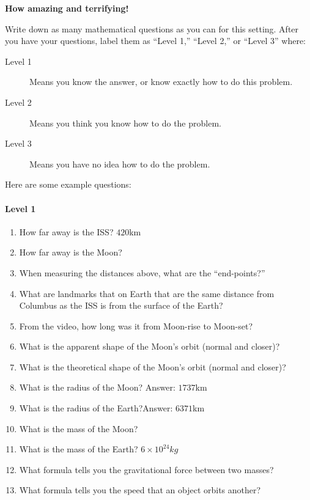 \documentclass{ximera}
\begin{document}
\begin{center}
\textbf{How amazing and terrifying!}
\end{center}
\begin{problem}
     Write down as many mathematical questions as you can for this
     setting. After you have your questions, label them as ``Level
     1,'' ``Level 2,'' or ``Level 3'' where:
\begin{description}
\item[Level 1] Means you know the answer, or know exactly how to do
  this problem.
\item[Level 2] Means you think you know how to do the problem.
\item[Level 3] Means you have no idea how to do the problem.
\end{description}
\begin{freeResponse}
  Here are some example questions:
  \paragraph{Level 1}
  \begin{enumerate}
  \item How far away is the ISS? $420$km
  \item How far away is the Moon? 
  \item When measuring the distances above, what are the ``end-points?''
  \item What are landmarks that on Earth that are the same distance
    from Columbus as the ISS is from the surface of the Earth?
  \item From the video, how long was it from Moon-rise to Moon-set?
  \item What is the apparent shape of the Moon's orbit (normal and
    closer)?
  \item What is the theoretical shape of the Moon's orbit (normal and
    closer)?
  \item What is the radius of the Moon? Answer: $1737$km
  \item What is the radius of the Earth?Answer: $6371$km
  \item What is the mass of the Moon?
  \item What is the mass of the Earth? $6\times 10^{24}kg$
  \item What formula tells you the gravitational force between two
    masses?
  \item What formula tells you the speed that an object orbits another?
  \end{enumerate}


\end{freeResponse}
\end{problem}
\end{document}

